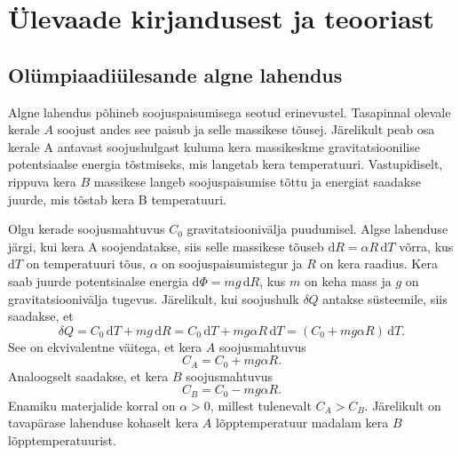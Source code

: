 \documentclass{trkut}%
\begin{document}
\chapter{Ülevaade kirjandusest ja teooriast}

\section{Olümpiaadiülesande algne lahendus} \label{algne}

Algne lahendus põhineb soojuspaisumisega seotud erinevustel. Tasapinnal olevale kerale $A$ soojust andes see paisub ja selle massikese tõusej. Järelikult peab osa kerale A antavast soojushulgast kuluma kera massikeskme gravitatsioonilise potentsiaalse energia tõstmiseks, mis langetab kera temperatuuri. Vastupidiselt, rippuva kera $B$ massikese langeb soojuspaisumise tõttu ja energiat saadakse juurde, mis tõstab kera B temperatuuri. \parencite[6-7]{ipho67}

Olgu kerade soojusmahtuvus $C_0$ gravitatsioonivälja puudumisel. Algse lahenduse järgi, kui kera A soojendatakse, siis selle massikese tõuseb $\mathrm{d}R=\alpha R \, \mathrm{d}T$ võrra, kus $\mathrm{d}T$ on temperatuuri tõus, $\alpha$ on soojuspaisumistegur ja $R$ on kera raadius. Kera saab juurde potentsiaalse energia $\mathrm{d}\Phi = mg \, \mathrm{d}R$, kus $m$ on keha mass ja $g$ on gravitatsioonivälja tugevus. Järelikult, kui soojushulk \(\delta Q\) antakse süsteemile, siis saadakse, et \parencite[2-3]{palma15}
\begin{equation}
    \delta Q = C_0 \, \mathrm{d}T + mg \, \mathrm{d}R = C_0 \, \mathrm{d}T + mg\alpha R \, \mathrm{d}T = (C_0 +  mg\alpha R) \, \mathrm{d}T.
\end{equation}
See on ekvivalentne väitega, et kera \(A\) soojusmahtuvus
\begin{equation}
    C_A = C_0 + mg\alpha R.
\end{equation}
Analoogselt saadakse, et kera \(B\) soojusmahtuvus
\begin{equation}
    C_B = C_0 - mg\alpha R.
\end{equation}
Enamiku materjalide korral on \(\alpha > 0\), millest tulenevalt \(C_A>C_B\). Järelikult on tavapärase lahenduse kohaselt kera \(A\) lõpptemperatuur madalam kera \(B\) lõpptemperatuurist.
\end{document}
